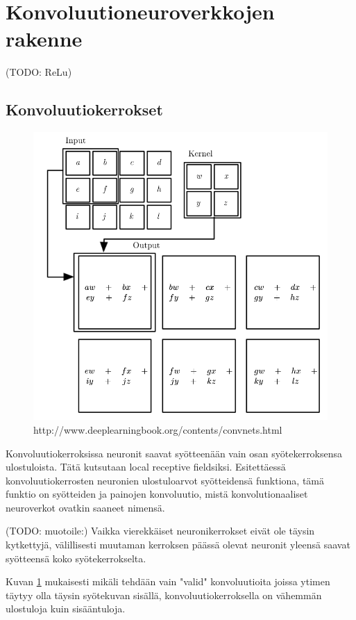 \documentclass[finnish]{tktltiki2}
\theoremstyle{definition}
\theoremstyle{remark}
\begin{document}
  \section{Konvoluutioneuroverkkojen rakenne}
  (TODO: ReLu)
  \subsection{Konvoluutiokerrokset}

  \begin{figure}[h]
  \label{pic:convolution}
  \centering
  \includegraphics[scale=0.4]{convolution}
  \caption{http://www.deeplearningbook.org/contents/convnets.html}
  \end{figure}

  Konvoluutiokerroksissa neuronit saavat syötteenään vain osan syötekerroksensa ulostuloista. Tätä kutsutaan local receptive fieldsiksi. Esitettäessä konvoluutiokerrosten neuronien ulostuloarvot syötteidensä funktiona, tämä funktio on syötteiden ja painojen konvoluutio, mistä konvolutionaaliset neuroverkot ovatkin saaneet nimensä. 

  (TODO: muotoile:) Vaikka vierekkäiset neuronikerrokset eivät ole täysin kytkettyjä, välillisesti muutaman kerroksen päässä olevat neuronit yleensä saavat syötteensä koko syötekerrokselta.
  
  Kuvan \ref{pic:convolution} mukaisesti mikäli tehdään vain "valid" konvoluutioita joissa ytimen täytyy olla täysin syötekuvan sisällä, konvoluutiokerroksella on vähemmän ulostuloja kuin sisääntuloja.
\end{document}
